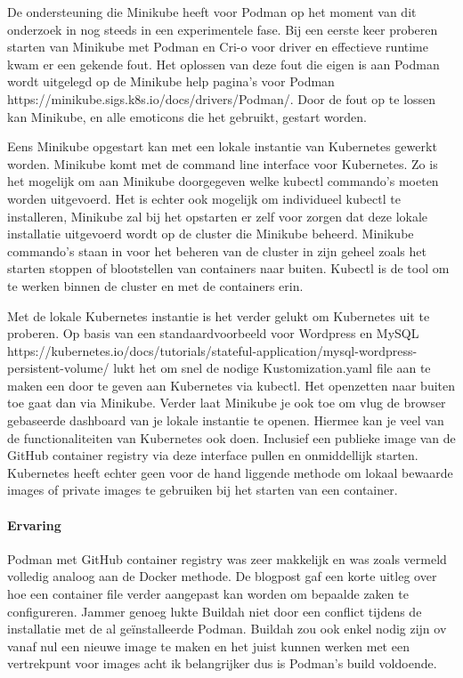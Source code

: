 \begin{itemize}
De ondersteuning die Minikube heeft voor Podman op het moment van dit onderzoek in nog steeds in een experimentele fase. Bij een eerste keer proberen starten van Minikube met Podman en Cri-o voor driver en effectieve runtime kwam er een gekende fout. Het oplossen van deze fout die eigen is aan Podman wordt uitgelegd op de Minikube help pagina’s voor Podman https://minikube.sigs.k8s.io/docs/drivers/Podman/. Door de fout op te lossen kan Minikube, en alle emoticons die het gebruikt, gestart worden.

Eens Minikube opgestart kan met een lokale instantie van Kubernetes gewerkt worden. Minikube komt met de command line interface voor Kubernetes. Zo is het mogelijk om aan Minikube doorgegeven welke kubectl commando’s moeten worden uitgevoerd. Het is echter ook mogelijk om individueel kubectl te installeren, Minikube zal bij het opstarten er zelf voor zorgen dat deze lokale installatie uitgevoerd wordt op de cluster die Minikube beheerd.  Minikube commando’s staan in voor het beheren van de cluster in zijn geheel zoals het starten stoppen of blootstellen van containers naar buiten. Kubectl is de tool om te werken binnen de cluster en met de containers erin.

Met de lokale Kubernetes instantie is het verder gelukt om Kubernetes uit te proberen. Op basis van een standaardvoorbeeld voor Wordpress en MySQL https://kubernetes.io/docs/tutorials/stateful-application/mysql-wordpress-persistent-volume/ lukt het om snel de nodige Kustomization.yaml file aan te maken een door te geven aan Kubernetes via kubectl. Het openzetten naar buiten toe gaat dan via Minikube. Verder laat Minikube je ook toe om vlug de browser gebaseerde dashboard van je lokale instantie te openen. Hiermee kan je veel van de functionaliteiten van Kubernetes ook doen. Inclusief een publieke image van de GitHub container registry via deze interface pullen en onmiddellijk starten. Kubernetes heeft echter geen voor de hand liggende methode om lokaal bewaarde images of private images te gebruiken bij het starten van een container.

\paragraph{Ervaring}
Podman met GitHub container registry was zeer makkelijk en was zoals vermeld volledig analoog aan de Docker methode. De blogpost gaf een korte uitleg over hoe een container file verder aangepast kan worden om bepaalde zaken te configureren. Jammer genoeg lukte Buildah niet door een conflict tijdens de installatie met de al geïnstalleerde Podman. Buildah zou ook enkel nodig zijn ov vanaf nul een nieuwe image te maken en het juist kunnen werken met een vertrekpunt voor images acht ik belangrijker dus is Podman’s build voldoende.


\end{itemize}

